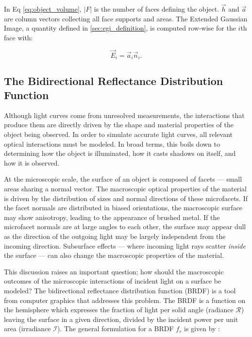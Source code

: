 In Eq \ref{eq:object_volume}, $\lvert F \rvert$ is the number of faces defining the object. $\vec{h}$ and $\vec{a}$ are column vectors collecting all face supports and areas. The Extended Gaussian Image, a quantity defined in \ref{sec:egi_definition}, is computed row-wise for the $i$th face with:

\begin{equation} \label{eq:egi_definition}
    \vec{E}_i = \vec{a}_i \vec{n}_i.
\end{equation}

\subsection{The Bidirectional Reflectance Distribution Function}

Although light curves come from unresolved measurements, the interactions that produce them are directly driven by the shape and material properties of the object being observed. In order to simulate accurate light curves, all relevant optical interactions must be modeled. In broad terms, this boils down to determining how the object is illuminated, how it casts shadows on itself, and how it is observed. 

At the microscopic scale, the surface of an object is composed of facets ---  small areas sharing a normal vector. The macroscopic optical properties of the material is driven by the distribution of sizes and normal directions of these microfacets. If the facet normals are distributed in biased orientations, the macroscopic surface may show anisotropy, leading to the appearance of brushed metal. If the microfacet normals are at large angles to each other, the surface may appear dull as the direction of the outgoing light may be largely independent from the incoming direction. Subsurface effects ---  where incoming light rays scatter \textit{inside} the surface --- can also change the macroscopic properties of the material. 

This discussion raises an important question; how should the macroscopic outcomes of the microscopic interactions of incident light on a surface be modeled? The bidirectional reflectance distribution function (BRDF) is a tool from computer graphics that addresses this problem. The BRDF is a function on the hemisphere which expresses the fraction of light per solid angle (radiance $\mathcal{R}$) leaving the surface in a given direction, divided by the incident power per unit area (irradiance $\mathcal{I}$). The general formulation for a BRDF $f_r$ is given by \cite{duvenhage2013}:

